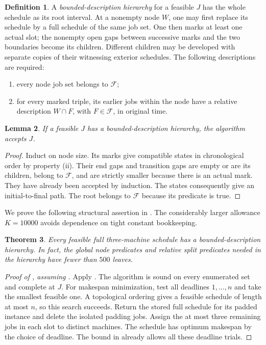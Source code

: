 \documentclass[11pt]{article}
\numberwithin{equation}{section}
\newtheorem{theorem}{Theorem}[section]
\newtheorem{lemma}[theorem]{Lemma}
\theoremstyle{definition}
\newtheorem{definition}[theorem]{Definition}
\theoremstyle{remark}
\newcommand{\F}{\mathcal F}
\begin{document}
\begin{definition}\label{def:hierarchy}
A \emph{bounded-description hierarchy} for a feasible \(J\) has the whole
schedule as its root interval. At a nonempty node \(W\), one may first
replace its schedule by a full schedule of the same job set. One then
marks at least one actual slot; the nonempty open gaps between successive
marks and the two boundaries become its children. Different children may
be developed with separate copies of their witnessing exterior schedules.
The following descriptions are required:
\begin{enumerate}[label=(\roman*)]
 \item every node job set belongs to \(\F\);
 \item for every marked triple, its earlier jobs within the node have a
 relative description \(W\cap F\), with \(F\in\F\), in original time.
\end{enumerate}
\end{definition}

\begin{lemma}\label{lem:hierarchy-dp}
If a feasible \(J\) has a bounded-description hierarchy, the algorithm
accepts \(J\).
\end{lemma}
\begin{proof}
Induct on node size. Its marks give compatible states in chronological
order by property (ii). Their end gaps and transition gaps are empty
or are its children, belong to \(\F\), and are strictly smaller because
there is an actual mark. They have already been accepted by induction.
The states consequently give an initial-to-final path.
The root belongs to \(\F\) because its predicate is true.
\end{proof}

We prove the following structural assertion in
.
The considerably larger allowance \(K=10000\) avoids dependence on tight
constant bookkeeping.

\begin{theorem}\label{thm:structure}
Every feasible full three-machine schedule has a bounded-description
hierarchy. In fact, the global node predicates and relative split
predicates needed in the hierarchy have fewer than \(500\) leaves.
\end{theorem}

\begin{proof}[Proof of , assuming ]
Apply .
The algorithm is sound on every enumerated set and complete at \(J\).
For makespan minimization, test all deadlines \(1,\ldots,n\) and take
the smallest feasible one. A topological ordering gives a feasible
schedule of length at most \(n\), so this search succeeds.
Return the stored full schedule for its padded instance and delete the
isolated padding jobs. Assign the at most three remaining jobs in each
slot to distinct machines. The schedule has optimum makespan by the
choice of deadline. The bound in  already allows
all these deadline trials.
\end{proof}
\end{document}
